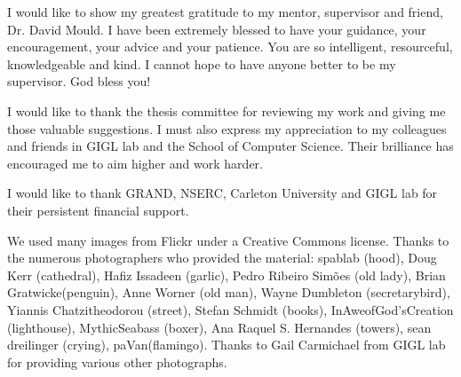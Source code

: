 I would like to show my greatest gratitude to my mentor, supervisor and friend, Dr. David Mould. I have been extremely blessed to have your guidance, your encouragement, your advice and your patience. You are so intelligent, resourceful, knowledgeable and kind. I cannot hope to have anyone better to be my supervisor. God bless you!

I would like to thank the thesis committee for reviewing my work and giving me those valuable suggestions. I must also express my appreciation to my colleagues and friends in GIGL lab and the School of Computer Science. Their brilliance has encouraged me to aim higher and work harder. 

I would like to thank GRAND, NSERC, Carleton University and GIGL lab for their persistent financial support. 

We used many images from Flickr under a Creative
Commons license. Thanks to the numerous photographers
who provided the material: spablab (hood), Doug Kerr (cathedral),
Hafiz Issadeen (garlic), Pedro Ribeiro Simões (old
lady), Brian Gratwicke(penguin), Anne Worner (old man), Wayne Dumbleton
(secretarybird), Yiannis Chatzitheodorou (street), Stefan
Schmidt (books), InAweofGod’sCreation (lighthouse),
MythicSeabass (boxer), Ana Raquel S. Hernandes (towers),
sean dreilinger (crying), paVan(flamingo). Thanks to Gail Carmichael from GIGL lab for providing various other photographs.